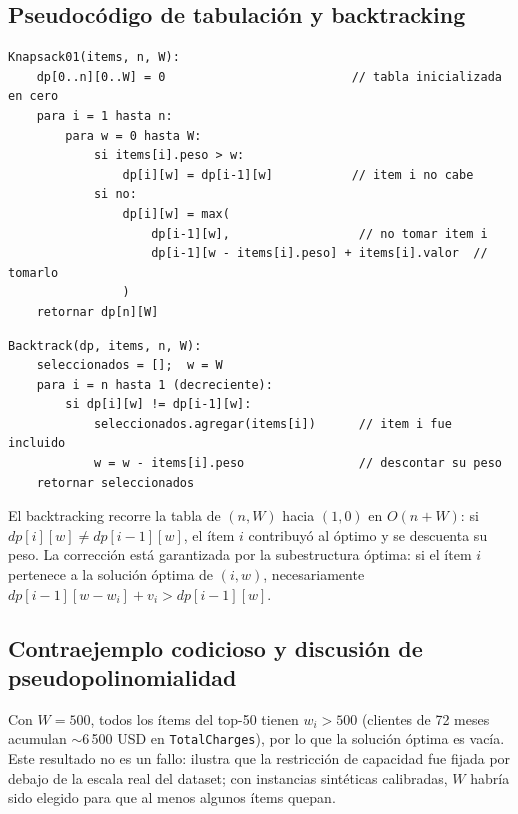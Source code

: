 \documentclass[11pt, a4paper]{article}
\begin{document}
\subsection{Pseudocódigo de tabulación y backtracking}

\begin{lstlisting}[caption=Tabulación bottom-up de la Mochila 0-1]
Knapsack01(items, n, W):
    dp[0..n][0..W] = 0                          // tabla inicializada en cero
    para i = 1 hasta n:
        para w = 0 hasta W:
            si items[i].peso > w:
                dp[i][w] = dp[i-1][w]           // item i no cabe
            si no:
                dp[i][w] = max(
                    dp[i-1][w],                  // no tomar item i
                    dp[i-1][w - items[i].peso] + items[i].valor  // tomarlo
                )
    retornar dp[n][W]
\end{lstlisting}

\begin{lstlisting}[caption=Backtracking para recuperar los ítems seleccionados]
Backtrack(dp, items, n, W):
    seleccionados = [];  w = W
    para i = n hasta 1 (decreciente):
        si dp[i][w] != dp[i-1][w]:
            seleccionados.agregar(items[i])      // item i fue incluido
            w = w - items[i].peso                // descontar su peso
    retornar seleccionados
\end{lstlisting}

El backtracking recorre la tabla de $(n,W)$ hacia $(1,0)$ en $O(n+W)$: si
$dp[i][w]\neq dp[i-1][w]$, el ítem $i$ contribuyó al óptimo y se descuenta su peso.
La corrección está garantizada por la subestructura óptima: si el ítem $i$ pertenece
a la solución óptima de $(i,w)$, necesariamente $dp[i-1][w-w_i]+v_i>dp[i-1][w]$.

\subsection{Contraejemplo codicioso y discusión de pseudopolinomialidad}

Con $W=500$, todos los ítems del top-50 tienen $w_i>500$ (clientes de 72 meses acumulan
$\sim$6\,500 USD en \texttt{TotalCharges}), por lo que la solución óptima es vacía.
Este resultado no es un fallo: ilustra que la restricción de capacidad fue fijada por
debajo de la escala real del dataset; con instancias sintéticas calibradas,
$W$ habría sido elegido para que al menos algunos ítems quepan.
\end{document}

